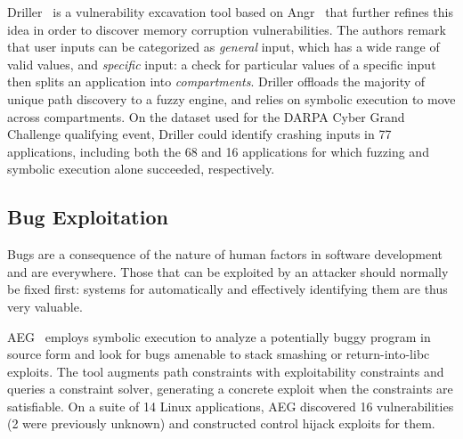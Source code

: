 Driller~\cite{DRILLER-NDSS16} is a vulnerability excavation tool based on {\sc Angr}~\cite{ANGR-SSP16} that further refines this idea in order to discover memory corruption vulnerabilities. The authors remark that user inputs can be categorized as {\em general} input, which has a wide range of valid values, and {\em specific} input: a check for particular values of a specific input then splits an application into {\em compartments}. Driller offloads the majority of unique path discovery to a fuzzy engine, and relies on symbolic execution to move across compartments. 
On the dataset used for the DARPA Cyber Grand Challenge qualifying event, Driller could identify crashing inputs in 77 applications, including both the 68 and 16 applications for which fuzzing and symbolic execution alone succeeded, respectively. %

\subsection{Bug Exploitation}
\label{ss:bug-exploitation}
Bugs are a consequence of the nature of human factors in software development and are everywhere. Those that can be exploited by an attacker should normally be fixed first: systems for automatically and effectively identifying them are thus very valuable.

{\sc AEG}~\cite{AEG-NDSS11} employs symbolic execution to analyze a potentially buggy program in source form and look for bugs amenable to stack smashing or return-into-libc exploits. The tool augments path constraints with exploitability constraints and queries a constraint solver, generating a concrete exploit when the constraints are satisfiable.
On a suite of 14 Linux applications, {\sc AEG} discovered 16 vulnerabilities (2 were previously unknown) and constructed control hijack exploits for them.

